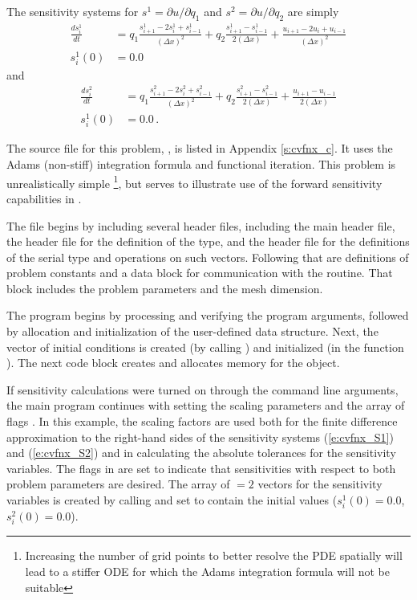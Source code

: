 The sensitivity systems for $s^1 = \partial u / \partial q_1$ and
$s^2 = \partial u / \partial q_2$ are simply
\begin{equation}\label{e:cvfnx_S1}
  \begin{split}
    \frac{d s^1_i}{dt} 
    &= q_1 \frac{s^1_{i+1}-2s^1_{i}+s^1_{i-1}}{(\Delta x)^{2}}
    + q_2 \frac{s^1_{i+1}-s^1_{i-1}}{2(\Delta x)} 
    + \frac{u_{i+1}-2u_{i}+u_{i-1}}{(\Delta x)^{2}} \\
    s^1_i (0) &= 0.0 
  \end{split}
\end{equation}
and
\begin{equation}\label{e:cvfnx_S2}
  \begin{split}
    \frac{d s^2_i}{dt} 
    &= q_1 \frac{s^2_{i+1}-2s^2_{i}+s^2_{i-1}}{(\Delta x)^{2}}
    + q_2 \frac{s^2_{i+1}-s^2_{i-1}}{2(\Delta x)} 
    + \frac{u_{i+1}-u_{i-1}}{2(\Delta x)} \\
    s^1_i (0) &= 0.0  \, .
  \end{split}
\end{equation}

The source file for this problem, , is listed in Appendix
\ref{s:cvfnx_c}.  It uses the Adams (non-stiff) integration formula and
functional iteration.  This problem is unrealistically simple
\footnote{Increasing the number of grid points to better resolve the PDE spatially
will lead to a stiffer ODE for which the Adams integration formula will not
be suitable}, but serves to illustrate use of the forward sensitivity 
capabilities in {\cvodes}.

The  file begins by including several header files, including 
the main {\cvodes} header file, the  header file for the
definition of the  type, and the {\nvecs} header file 
for the definitions of the serial  type and operations on such vectors.
Following that are definitions of problem constants and a data block for communication
with the  routine.  That block includes the problem parameters and the mesh 
dimension.

The  program begins by processing and verifying the program arguments,
followed by allocation and initialization of the user-defined data structure. Next, the
vector of initial conditions is created (by calling ) and
initialized (in the function ). The next code block creates and allocates
memory for the {\cvodes} object. 

If sensitivity calculations were turned on through the command line arguments,
the main program continues with setting the scaling parameters
 and the array of flags . In this example,
the scaling factors  are used both for the finite difference approximation
to the right-hand sides of the sensitivity systems (\ref{e:cvfnx_S1}) 
and (\ref{e:cvfnx_S2}) and in calculating the absolute tolerances for the 
sensitivity variables. 
The flags in  are set to indicate that sensitivities with respect to both 
problem parameters are desired.
The array of  $=2$ vectors  for the sensitivity variables is created
by calling  and set to contain the initial values
($s^1_i(0) = 0.0$, $s^2_i(0) = 0.0$).

